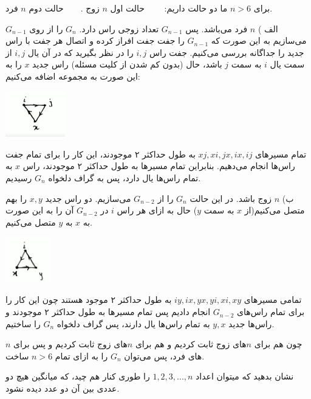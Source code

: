 \documentclass[11pt,largemargins]{h2wp}
\begin{document}
   برای $n>6$ ما دو حالت داریم: $\; \; \; \; \; \;$ حالت اول $n$ زوج
   .$\; \; \; \; \; \;$
   حالت دوم $n$ فرد.   
   
    الف ) $n$ فرد می‌باشد. پس
    $G_{n-1}$ تعداد زوجی راس دارد. $G_{n}$ را از روی 
    $G_{n-1}$ می‌سازیم به این صورت که  $G_{n-1}$ را جفت جفت افراز کرده و اتصال هر جفت با راس جدید را جداگانه بررسی می‌کنیم. جفت راس $i, j$ را در نظر بگیرید که در آن یال $i, j$ از سمت یال $i$ به سمت
     $j$   باشد، حال 
     (بدون کم شدن از کلیت مسئله)
      راس جدید
     $x$
      را به این صورت به مجموعه اضافه می‌کنیم:

    
       {\hspace*{6cm}\includegraphics[height=2cm]{Graph2.jpg}}    
       
    تمام مسیر‌های
    $xj, xi, jx, ix, ij$ به طول حداکثر ۲ موجودند، این کار را برای تمام جفت راس‌ها انجام می‌دهیم. بنابراین تمام مسیر‌ها به طول حداکثر ۲ موجودند، راس $x$ به تمام راس‌ها یال دارد، پس به گراف دلخواه $G_{n}$ رسیدیم.
    
    ب) $n$ زوج باشد. در این حالت $G_{n}$ را از $G_{n-2}$ می‌سازیم. دو راس جدید $x, y$ را بهم متصل می‌کنیم(از $x$ به سمت $y$) حال به ازای هر راس $i$ در $G_{n-2}$ آن را به این صورت به $x$ به $y$ متصل می‌کنیم.
    
        {\hspace*{6cm}\includegraphics[height=2cm]{Graph3.jpg}}      
    
    تمامی مسیر‌های $iy, ix, yx, yi, xi, xy$ به طول حداکثر ۲ موجود هستند چون این کار را برای تمام راس‌های $G_{n-2}$ انجام دادیم پس تمام مسیرها به طول حداکثر ۲ موجودند و راس‌ها جدید $y, x$ به تمام راس‌ها یال دارند، پس گراف دلخواه $G_{n}$ را ساختیم.
    
    چون هم برای $n$های زوج ثابت کردیم و هم برای $n$های زوج ثابت کردیم و پس برای $n$های فرد، پس می‌توان $G_{n}$ را به ازای تمام 
    $n>6$ ساخت.

\question

 نشان بدهید که میتوان اعداد $1,2,3,...,n$ را طوری کنار هم چید، که میانگین هیچ دو عددی بین آن دو عدد دیده نشود. 
 
\end{document}
